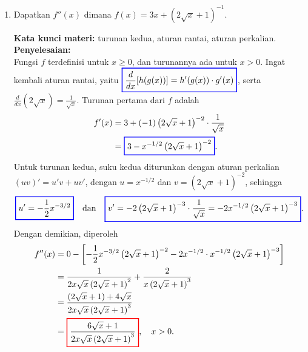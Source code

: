 \documentclass[10pt,openany,a4paper]{article}
\theoremstyle{definition}
\theoremstyle{definition}
\theoremstyle{plain}
\newenvironment{jawab}[2][tes]{%
\par\noindent\textbf{Kata kunci materi:} #1.\\
\textbf{Penyelesaian:} #2%
}{}
\begin{document}
\begin{enumerate}
    \item Dapatkan $f''(x)$ dimana $f(x)=3x+\left(2\sqrt{x}+1\right)^{-1}$.
    \begin{jawab}[turunan kedua, aturan rantai, aturan perkalian]{~\\
        Fungsi $f$ terdefinisi untuk $x\geq 0$, dan turunannya ada untuk $x>0$. Ingat kembali aturan rantai, yaitu $\colorlet{oldcolor}{.}
        \color{blue}
        \setlength{\fboxrule}{1pt} \boxed{\color{oldcolor}\frac{d}{dx}[h(g(x))] = h'(g(x)) \cdot g'(x)}\color{oldcolor}$, serta $\frac{d}{dx}\left(2\sqrt{x}\right)=\frac{1}{\sqrt{x}}$. Turunan pertama dari $f$ adalah
        \begin{align*}
            f'(x) &= 3 + (-1)\left(2\sqrt{x}+1\right)^{-2}\cdot\frac{1}{\sqrt{x}}\\
            &= \colorlet{oldcolor}{.}
        \color{blue}
        \setlength{\fboxrule}{1pt} \boxed{\color{oldcolor}3 - x^{-1/2}\left(2\sqrt{x}+1\right)^{-2}}\color{oldcolor}.
        \end{align*}
        Untuk turunan kedua, suku kedua diturunkan dengan aturan perkalian $(uv)'=u'v+uv'$, dengan $u=x^{-1/2}$ dan $v=\left(2\sqrt{x}+1\right)^{-2}$, sehingga
        \begin{align*}
            \colorlet{oldcolor}{.}
        \color{blue}
        \setlength{\fboxrule}{1pt} \boxed{\color{oldcolor}u'=-\frac{1}{2}x^{-3/2}}\color{oldcolor} \quad\text{dan}\quad \colorlet{oldcolor}{.}
        \color{blue}
        \setlength{\fboxrule}{1pt} \boxed{\color{oldcolor}v'=-2\left(2\sqrt{x}+1\right)^{-3}\cdot\frac{1}{\sqrt{x}}=-2x^{-1/2}\left(2\sqrt{x}+1\right)^{-3}}\color{oldcolor}.
        \end{align*}
        Dengan demikian, diperoleh
        \begin{align*}
            f''(x) &= 0 - \left[-\frac{1}{2}x^{-3/2}\left(2\sqrt{x}+1\right)^{-2} - 2x^{-1/2}\cdot x^{-1/2}\left(2\sqrt{x}+1\right)^{-3}\right]\\
            &= \frac{1}{2x\sqrt{x}\left(2\sqrt{x}+1\right)^{2}} + \frac{2}{x\left(2\sqrt{x}+1\right)^{3}}\\
            &= \frac{\left(2\sqrt{x}+1\right) + 4\sqrt{x}}{2x\sqrt{x}\left(2\sqrt{x}+1\right)^{3}}\\
            &= \colorlet{oldcolor}{.}
        \color{red}
        \setlength{\fboxrule}{1pt} \boxed{\color{oldcolor}\frac{6\sqrt{x}+1}{2x\sqrt{x}\left(2\sqrt{x}+1\right)^{3}}}\color{oldcolor}, \quad x>0.
        \end{align*}
    }
    \end{jawab}
\end{enumerate}
\end{document}
